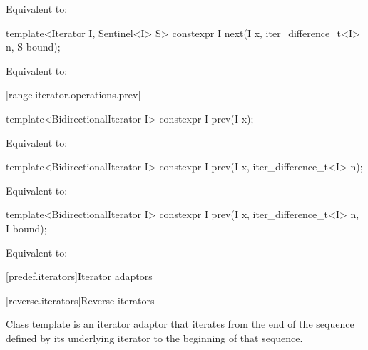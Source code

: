 \begin{addedblock}
\begin{itemdescr}
\pnum
\effects Equivalent to: 
\end{itemdescr}

%
\begin{itemdecl}
template<Iterator I, Sentinel<I> S>
  constexpr I next(I x, iter_difference_t<I> n, S bound);
\end{itemdecl}

\begin{itemdescr}
\pnum
\effects Equivalent to: 
\end{itemdescr}

[range.iterator.operations.prev]{}
%
\begin{itemdecl}
template<BidirectionalIterator I>
  constexpr I prev(I x);
\end{itemdecl}

\begin{itemdescr}
\pnum
\effects Equivalent to: 
\end{itemdescr}

%
\begin{itemdecl}
template<BidirectionalIterator I>
  constexpr I prev(I x, iter_difference_t<I> n);
\end{itemdecl}

\begin{itemdescr}
\pnum
\effects Equivalent to: 
\end{itemdescr}

%
\begin{itemdecl}
template<BidirectionalIterator I>
  constexpr I prev(I x, iter_difference_t<I> n, I bound);
\end{itemdecl}

\begin{itemdescr}
\pnum
\effects Equivalent to: 
\end{itemdescr}
\end{addedblock}

[predef.iterators]{Iterator adaptors}

[reverse.iterators]{Reverse iterators}

\pnum
Class template  is an iterator adaptor that iterates
from the end of the sequence defined by its underlying iterator to the beginning
of that sequence.

